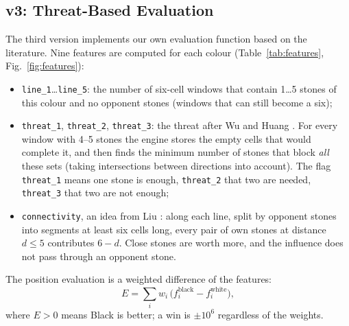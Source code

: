 \documentclass[a4paper,10pt,twocolumn]{article}
\newcommand{\code}[1]{\texttt{#1}}
\begin{document}
\subsection{v3: Threat-Based Evaluation}\label{sec:v3}
The third version implements our own evaluation function based on the literature. Nine features are computed for each colour (Table~\ref{tab:features}, Fig.~\ref{fig:features}):

\begin{itemize}\itemsep0pt
\item \code{line\_1}\ldots\code{line\_5}: the number of six-cell windows that contain 1\ldots5 stones of this colour and no opponent stones (windows that can still become a six);
\item \code{threat\_1}, \code{threat\_2}, \code{threat\_3}: the threat after Wu and Huang \citeyearpar{wu2005family}. For every window with 4--5 stones the engine stores the empty cells that would complete it, and then finds the minimum number of stones that block \emph{all} these sets (taking intersections between directions into account). The flag \code{threat\_1} means one stone is enough, \code{threat\_2} that two are needed, \code{threat\_3} that two are not enough;
\item \code{connectivity}, an idea from Liu \citeyearpar{liu_defensive}: along each line, split by opponent stones into segments at least six cells long, every pair of own stones at distance $d\le5$ contributes $6-d$. Close stones are worth more, and the influence does not pass through an opponent stone.
\end{itemize}

The position evaluation is a weighted difference of the features:
\begin{equation}
E=\sum_{i} w_i\,\bigl(f_i^{\text{black}}-f_i^{\text{white}}\bigr),
\label{eq:eval}
\end{equation}
where $E>0$ means Black is better; a win is $\pm10^6$ regardless of the weights.
\end{document}
